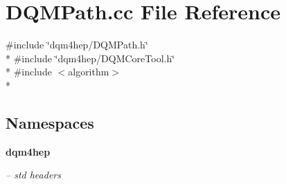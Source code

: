 \section{D\+Q\+M\+Path.\+cc File Reference}
\label{DQMPath_8cc}
{\ttfamily \#include \char`\"{}dqm4hep/\+D\+Q\+M\+Path.\+h\char`\"{}}\\*
{\ttfamily \#include \char`\"{}dqm4hep/\+D\+Q\+M\+Core\+Tool.\+h\char`\"{}}\\*
{\ttfamily \#include $<$algorithm$>$}\\*
\subsection*{Namespaces}
\begin{DoxyCompactItemize}
\item 
 {\bf dqm4hep}
\begin{DoxyCompactList}\small\item\em -- std headers \end{DoxyCompactList}\end{DoxyCompactItemize}
